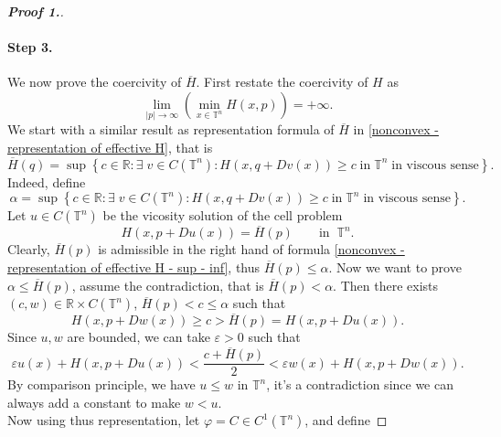 \documentclass[12pt, oneside]{amsart}  	%
\begin{document}
\begin{proof}[\textbf{Proof 1.}]
\paragraph{\textbf{Step 3.}} We now prove the coercivity of $\overline{H}$. First restate the coercivity of $H$ as
\begin{equation}\label{rewrite the uniformly in x coercivity of H}
\lim_{|p|\longrightarrow\infty} \left( \min_{x\in \mathbb{T}^n} H(x,p)\right) = +\infty.
\end{equation}
We start with a similar result as representation formula of $\overline{H}$ in \eqref{nonconvex - representation of effective H}, that is
\begin{equation}\label{nonconvex - representation of effective H - sup - inf}
\overline{H}(q) = \sup \left\lbrace c\in \mathbb{R}: \exists\;v\in C(\mathbb{T}^n): H(x,q+Dv(x))\geq c\;\text{in}\;\mathbb{T}^n\;\text{in viscous sense}\right\rbrace .
\end{equation}
Indeed, define
\begin{equation*}
\alpha = \sup \left\lbrace c\in \mathbb{R}: \exists\;v\in C(\mathbb{T}^n): H(x,q+Dv(x))\geq c\;\text{in}\;\mathbb{T}^n\;\text{in viscous sense}\right\rbrace .
\end{equation*}
Let $u\in C(\mathbb{T}^n)$ be the vicosity solution of the cell problem
\begin{equation*}
H(x,p+Du(x)) = \overline{H}(p) \qquad\text{in}\;\;\mathbb{T}^n.
\end{equation*}
Clearly, $\overline{H}(p)$ is admissible in the right hand of formula \eqref{nonconvex - representation of effective H - sup - inf}, thus $\overline{H}(p) \leq \alpha$. Now we want to prove $\alpha \leq \overline{H}(p)$, assume the contradiction, that is $\overline{H}(p) < \alpha$. Then there exists $(c,w)\in \mathbb{R}\times C(\mathbb{T}^n)$, $\overline{H}(p) < c \leq \alpha$ such that
\begin{equation*}
H(x,p+Dw(x)) \geq c >\overline{H}(p) = H(x,p+Du(x)).
\end{equation*}
Since $u,w$ are bounded, we can take $\varepsilon>0$ such that
\begin{equation*}
\varepsilon u(x) +H(x,p+Du(x)) < \frac{c+\overline{H}(p)}{2} < \varepsilon w(x) + H(x,p+Dw(x)).
\end{equation*}
By comparison principle, we have $u\leq w$ in $\mathbb{T}^n$, it's  a contradiction since we can always add a constant to make $w<u$.\\
Now using thus representation, let $\varphi = C\in  C^1(\mathbb{T}^n)$, and define

\end{proof}
\end{document}
